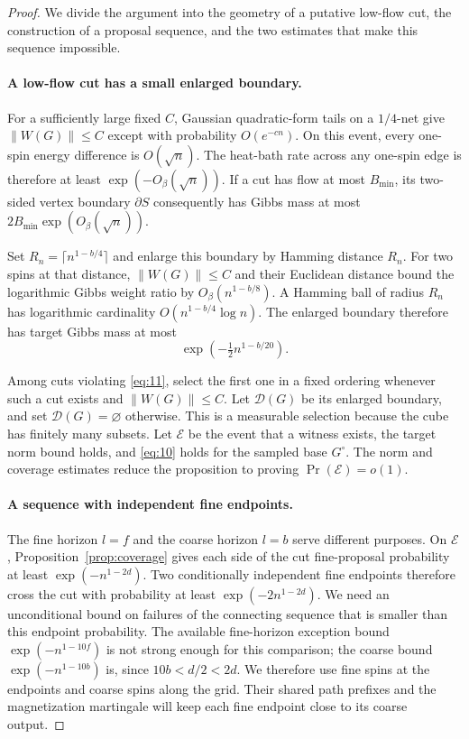 \begin{proof}
We divide the argument into the geometry of a putative low-flow cut,
the construction of a proposal sequence, and the two estimates that
make this sequence impossible.

\paragraph{A low-flow cut has a small enlarged boundary.}
For a sufficiently large fixed $C$, Gaussian quadratic-form tails on
a $1/4$-net give $\|W(G)\|\le C$ except with probability
$O(e^{-cn})$. On this event, every one-spin energy difference is
$O(\sqrt n)$. The heat-bath rate across any one-spin edge is therefore
at least $\exp(-O_\beta(\sqrt n))$.
If a cut has flow at most $B_{\min}$, its two-sided vertex boundary
$\partial S$ consequently has Gibbs mass at most
$2B_{\min}\exp(O_\beta(\sqrt n))$.

Set $R_n=\lceil n^{1-b/4}\rceil$ and enlarge this boundary by
Hamming distance $R_n$. For two spins at that distance,
$\|W(G)\|\le C$ and their Euclidean distance bound the logarithmic
Gibbs weight ratio by $O_\beta(n^{1-b/8})$. A Hamming ball of radius
$R_n$ has logarithmic cardinality $O(n^{1-b/4}\log n)$.
The enlarged boundary therefore has target Gibbs mass at most
\[
 \exp(-\tfrac12n^{1-b/20}).
 \tag{12}\label{eq:12}
\]

Among cuts violating \eqref{eq:11}, select the first one in a fixed
ordering whenever such a cut exists and $\|W(G)\|\le C$.
Let $\mathcal D(G)$ be its enlarged boundary, and set
$\mathcal D(G)=\varnothing$ otherwise. This is a measurable
selection because the cube has finitely many subsets.
Let $\mathcal E$ be the event that a witness exists, the target
norm bound holds, and \eqref{eq:10} holds for the sampled base
$G^\circ$. The norm and coverage estimates reduce the proposition
to proving $\Pr(\mathcal E)=o(1)$.

\paragraph{A sequence with independent fine endpoints.}
The fine horizon $l=f$ and the coarse horizon $l=b$ serve different
purposes. On $\mathcal E$,
Proposition~\ref{prop:coverage} gives each side of the cut fine-proposal
probability at least $\exp(-n^{1-2d})$. Two conditionally independent
fine endpoints therefore cross the cut with probability at least
$\exp(-2n^{1-2d})$. We need an unconditional bound on failures of
the connecting sequence that is smaller than this endpoint probability.
The available fine-horizon exception bound
$\exp(-n^{1-10f})$ is not strong enough for this comparison; the
coarse bound $\exp(-n^{1-10b})$ is, since $10b<d/2<2d$.
We therefore use fine spins at the endpoints and coarse spins along
the grid. Their shared path prefixes and the magnetization martingale
will keep each fine endpoint close to its coarse output.


\end{proof}

